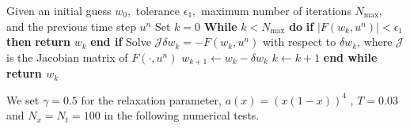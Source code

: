 \documentclass[reqno]{amsart}
\theoremstyle{plain}
\theoremstyle{remark}
\numberwithin{equation}{section}
\begin{document}
           
\begin{algorithm}[H]
\caption{Algorithm with Newton’s Method}
\begin{algorithmic}[1]
    \State Given an initial guess $w_0,$ tolerance $\epsilon_1,$ maximum number of iterations $N_{\text{max}},$ and the previous time step $u^n$\;
    \State Set $k=0$\;
            \State \textbf{While} $k<N_{\text{max}}$ \textbf{do}
            \State \quad\textbf{if} $\vert F(w_k,u^n) \vert<\epsilon_1$ \textbf{then}
            \State \qquad\textbf{return} $w_k$
            \State \quad\textbf{end if}
            \State \quad Solve $\mathcal{J}\delta w_k=-F(w_k,u^n)$ with respect to $\delta w_k $, where $\mathcal{J}$ is the Jacobian matrix of $F(\cdot,u^n)$
            \State \quad $w_{k+1}\leftarrow w_k-\delta w_k$
            \State \quad $k\leftarrow k+1$
            \State \textbf{end while}
            \State \textbf{return $w_k$}
\end{algorithmic}
    
\end{algorithm}
 We set $\gamma=0.5$ for the relaxation parameter, $a(x)=(x(1-x))^4$ , $T=0.03$ and $N_x=N_t=100$ in the following numerical tests.
\end{document}
